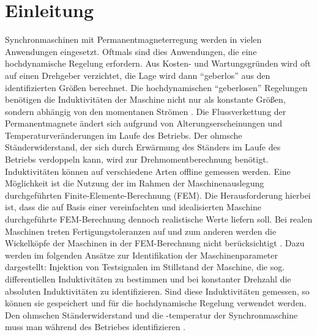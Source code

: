 \documentclass[conference,twocolumn]{IEEEtran}
\begin{document}
\section{Einleitung}
Synchronmaschinen mit Permanentmagneterregung werden in vielen Anwendungen eingesetzt.
Oftmals sind dies Anwendungen, die eine hochdynamische Regelung erfordern.
Aus Kosten- und Wartungsgründen wird oft auf einen Drehgeber verzichtet, die Lage wird dann \enquote{geberlos} aus den identifizierten Größen berechnet.
Die hochdynamischen \enquote{geberlosen} Regelungen benötigen die Induktivitäten der Maschine nicht nur als konstante Größen, sondern abhängig von den momentanen Strömen \autocite{Kellner2012}.
Die Flussverkettung der Permanentmagnete ändert sich aufgrund von Alterungserscheinungen und Temperaturveränderungen im Laufe des Betriebs.
Der ohmsche Ständerwiderstand, der sich durch Erwärmung des Ständers im Laufe des Betriebs verdoppeln kann, wird zur Drehmomentberechnung benötigt.
Induktivitäten können auf verschiedene Arten offline gemessen werden.
Eine Möglichkeit ist die Nutzung der im Rahmen der Maschinenauslegung durchgeführten Finite-Elemente-Berechnung (FEM).
Die Herausforderung hierbei ist, dass die auf Basis einer vereinfachten und idealisierten Maschine durchgeführte FEM-Berechnung dennoch realistische Werte liefern soll.
Bei realen Maschinen treten Fertigungstoleranzen auf und zum anderen werden die Wickelköpfe der Maschinen in der FEM-Berechnung nicht berücksichtigt \autocite{ternes2012}.
Dazu werden im folgenden Ansätze zur Identifikation der Maschinenparameter dargestellt:
Injektion von Testsignalen im Stillstand der Maschine, die sog. differentiellen Induktivitäten zu bestimmen und bei konstanter Drehzahl die absoluten Induktivitäten zu identifizieren.
Sind diese Induktivitäten gemessen, so können sie gespeichert und für die hochdynamische Regelung verwendet werden.
Den ohmschen Ständerwiderstand und die -temperatur der Synchronmaschine muss man während des Betriebes identifizieren \autocite{Kellner2012}.
\end{document}
